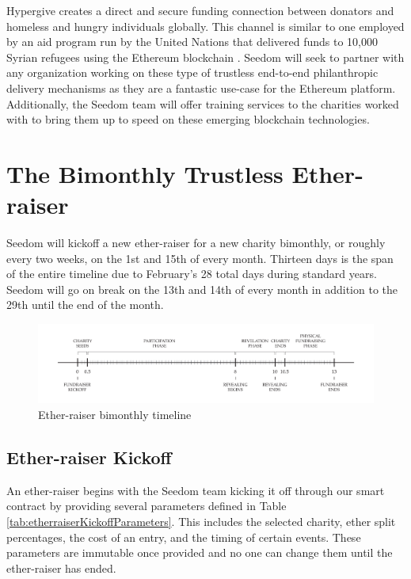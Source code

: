 \documentclass[11pt]{article}
\begin{document}
Hypergive creates a direct and secure funding connection between donators and homeless and hungry individuals globally. This channel is similar to one employed by an aid program run by the United Nations that delivered funds to 10,000 Syrian refugees using the Ethereum blockchain \cite{6}. Seedom will seek to partner with any organization working on these type of trustless end-to-end philanthropic delivery mechanisms as they are a fantastic use-case for the Ethereum platform. Additionally, the Seedom team will offer training services to the charities worked with to bring them up to speed on these emerging blockchain technologies.

\section{The Bimonthly Trustless Ether-raiser}

Seedom will kickoff a new ether-raiser for a new charity bimonthly, or roughly every two weeks, on the 1st and 15th of every month. Thirteen days is the span of the entire timeline due to February's 28 total days during standard years. Seedom will go on break on the 13th and 14th of every month in addition to the 29th until the end of the month.

\begin{figure}[H]
\begin{center}
\includegraphics[width=1.0\textwidth]{./graphics/etherraiserBimonthlyTimeline.pdf}
\caption{Ether-raiser bimonthly timeline}
\label{figure:etherraiserBimonthlyTimeline}
\end{center}
\end{figure}

\subsection{Ether-raiser Kickoff}

An ether-raiser begins with the Seedom team kicking it off through our smart contract by providing several parameters defined in Table \ref{tab:etherraiserKickoffParameters}. This includes the selected charity, ether split percentages, the cost of an entry, and the timing of certain events. These parameters are immutable once provided and no one can change them until the ether-raiser has ended.
\end{document}
